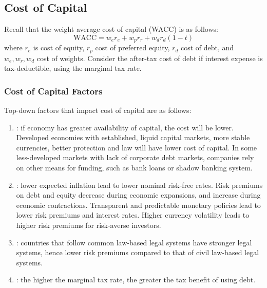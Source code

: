 \subsection{Cost of Capital}

Recall that the weight average cost of capital (WACC) is as follows:
\begin{equation}
\text{WACC} = w_e r_e + w_p r_r + w_d r_d (1-t) \nonumber 
\end{equation}
where $r_e$ is cost of equity, $r_p$ cost of preferred equity, $r_d$ cost of debt, and $w_e, w_r, w_d$ cost of weights. Consider the after-tax cost of debt if interest expense is tax-deductible, using the marginal tax rate.

\subsubsection{Cost of Capital Factors}

\begin{remark} Top-down factors that impact cost of capital are as follows:
\begin{enumerate}[label=\roman*.]
\setlength{\itemsep}{0pt}
\item {}: if economy has greater availability of capital, the cost will be lower. Developed economies with established, liquid capital markets, more stable currencies, better protection and law will have lower cost of capital. In some less-developed markets with lack of corporate debt markets, companies rely on other means for funding, such as bank loans or shadow banking system.
\item {}: lower expected inflation lead to lower nominal risk-free rates. Risk premiums on debt and equity decrease during economic expansions, and increase during economic contractions. Transparent and predictable monetary policies lead to lower risk premiums and interest rates. Higher currency volatility leads to higher risk premiums for risk-averse investors.
\item {}: countries that follow common law-based legal systems have stronger legal systems, hence lower risk premiums compared to that of civil law-based legal systems.
\item {}: the higher the marginal tax rate, the greater the tax benefit of using debt.
\end{enumerate}
\end{remark}

